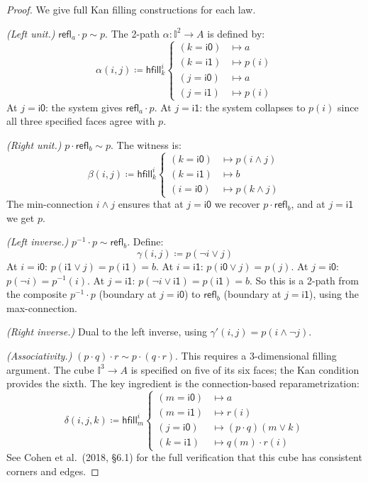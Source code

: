 \documentclass[11pt,a4paper]{report}
\theoremstyle{definition}
\theoremstyle{plain}
\newcommand{\interval}{\mathbb{I}}
\newcommand{\hfilling}{\mathsf{hfill}}
\begin{document}
\begin{proof}
We give full Kan filling constructions for each law.

\emph{(Left unit.)} $\mathsf{refl}_a \cdot p \sim p$.
The 2-path $\alpha : \interval^2 \to A$ is defined by:
\[
  \alpha(i, j) \coloneqq \hfilling^i_k
  \begin{cases}
    (k = \mathsf{i0}) &\mapsto a \\
    (k = \mathsf{i1}) &\mapsto p(i) \\
    (j = \mathsf{i0}) &\mapsto a \\
    (j = \mathsf{i1}) &\mapsto p(i)
  \end{cases}
\]
At $j = \mathsf{i0}$: the system gives $\mathsf{refl}_a \cdot p$.
At $j = \mathsf{i1}$: the system collapses to $p(i)$ since all three
specified faces agree with $p$.

\emph{(Right unit.)} $p \cdot \mathsf{refl}_b \sim p$. The witness is:
\[
  \beta(i, j) \coloneqq \hfilling^i_k
  \begin{cases}
    (k = \mathsf{i0}) &\mapsto p(i \land j) \\
    (k = \mathsf{i1}) &\mapsto b \\
    (i = \mathsf{i0}) &\mapsto p(k \land j)
  \end{cases}
\]
The min-connection $i \land j$ ensures that at $j = \mathsf{i0}$ we
recover $p \cdot \mathsf{refl}_b$, and at $j = \mathsf{i1}$ we get $p$.

\emph{(Left inverse.)} $p^{-1} \cdot p \sim \mathsf{refl}_b$.
Define:
\[
  \gamma(i, j) \coloneqq p(\lnot i \lor j)
\]
At $i = \mathsf{i0}$: $p(\mathsf{i1} \lor j) = p(\mathsf{i1}) = b$.
At $i = \mathsf{i1}$: $p(\mathsf{i0} \lor j) = p(j)$.
At $j = \mathsf{i0}$: $p(\lnot i) = p^{-1}(i)$.
At $j = \mathsf{i1}$: $p(\lnot i \lor \mathsf{i1}) = p(\mathsf{i1}) = b$.
So this is a 2-path from the composite $p^{-1} \cdot p$
(boundary at $j = \mathsf{i0}$) to $\mathsf{refl}_b$
(boundary at $j = \mathsf{i1}$), using the max-connection.

\emph{(Right inverse.)} Dual to the left inverse, using
$\gamma'(i, j) = p(i \land \lnot j)$.

\emph{(Associativity.)} $(p \cdot q) \cdot r \sim p \cdot (q \cdot r)$.
This requires a 3-dimensional filling argument.  The cube
$\interval^3 \to A$ is specified on five of its six faces; the Kan
condition provides the sixth.  The key ingredient is the
connection-based reparametrization:
\[
  \delta(i, j, k) \coloneqq \hfilling^i_m
  \begin{cases}
    (m = \mathsf{i0}) &\mapsto a \\
    (m = \mathsf{i1}) &\mapsto r(i) \\
    (j = \mathsf{i0}) &\mapsto (p \cdot q)(m \lor k) \\
    (k = \mathsf{i1}) &\mapsto q(m) \cdot r(i)
  \end{cases}
\]
See Cohen et al.~(2018, \S 6.1) for the full verification that this
cube has consistent corners and edges.
\end{proof}
\end{document}
